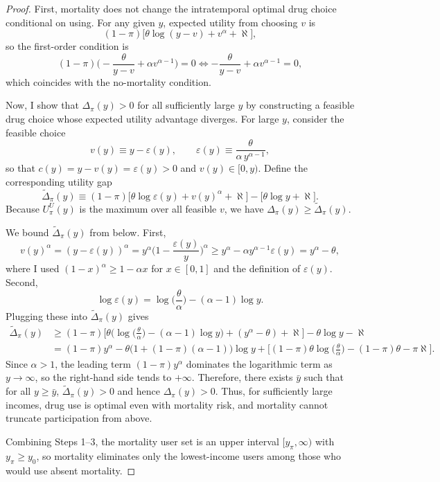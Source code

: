 \begin{proof}
First, mortality does not change the intratemporal optimal drug choice conditional on using. For any given $y$, expected utility from choosing $v$ is
\[
(1-\pi)\big[\theta\log(y-v)+v^\alpha+\aleph\big],
\]
so the first-order condition is
\[
(1-\pi)\Big(-\frac{\theta}{y-v}+\alpha v^{\alpha-1}\Big)=0
\iff-\frac{\theta}{y-v}+\alpha v^{\alpha-1}=0,
\]
which coincides with the no-mortality condition.

Now, I show that $\Delta_\pi(y)>0$ for all sufficiently large $y$ by constructing a feasible drug choice
whose expected utility advantage diverges. For large $y$, consider the feasible choice
\[
v(y)\equiv y-\varepsilon(y), \qquad
\varepsilon(y)\equiv \frac{\theta}{\alpha\,y^{\alpha-1}},
\]
so that $c(y)=y-v(y)=\varepsilon(y)>0$ and $v(y)\in[0,y)$.
Define the corresponding utility gap
\[
\widetilde\Delta_\pi(y)
\equiv(1-\pi)\big[\theta\log\varepsilon(y)+v(y)^\alpha+\aleph\big]
-\big[\theta\log y+\aleph\big].
\]
Because $U_\pi^U(y)$ is the maximum over all feasible $v$, we have $\Delta_\pi(y)\ge \widetilde\Delta_\pi(y)$.

We bound $\widetilde\Delta_\pi(y)$ from below. First,
\[
v(y)^\alpha = (y-\varepsilon(y))^\alpha
= y^\alpha\Big(1-\frac{\varepsilon(y)}{y}\Big)^\alpha
\ge y^\alpha - \alpha y^{\alpha-1}\varepsilon(y)
= y^\alpha-\theta,
\]
where I used $(1-x)^\alpha\ge 1-\alpha x$ for $x\in[0,1]$ and the definition of $\varepsilon(y)$.
Second,
\[
\log\varepsilon(y)=\log\Big(\frac{\theta}{\alpha}\Big)-(\alpha-1)\log y.
\]
Plugging these into $\widetilde\Delta_\pi(y)$ gives
\begin{align*}
\widetilde\Delta_\pi(y)
&\ge (1-\pi)\Big[\theta\Big(\log\Big(\frac{\theta}{\alpha}\Big)-(\alpha-1)\log y\Big)
+ (y^\alpha-\theta)+\aleph\Big]
-\theta\log y-\aleph \\
&=
(1-\pi)y^\alpha
-\theta\Big(1+(1-\pi)(\alpha-1)\Big)\log y
+\Big[(1-\pi)\theta\log\Big(\frac{\theta}{\alpha}\Big)-(1-\pi)\theta-\pi\aleph\Big].
\end{align*}
Since $\alpha>1$, the leading term $(1-\pi)y^\alpha$ dominates the logarithmic term as $y\to\infty$,
so the right-hand side tends to $+\infty$. Therefore,
there exists $\bar y$ such that for all $y\ge \bar y$, $\widetilde\Delta_\pi(y)>0$ and hence $\Delta_\pi(y)>0$.
Thus, for sufficiently large incomes, drug use is optimal even with mortality risk,
and mortality cannot truncate participation from above.

Combining Steps 1--3, the mortality user set is an upper interval $[y_\pi,\infty)$ with $y_\pi\ge y_0$,
so mortality eliminates only the lowest-income users among those who would use absent mortality.
\end{proof}

